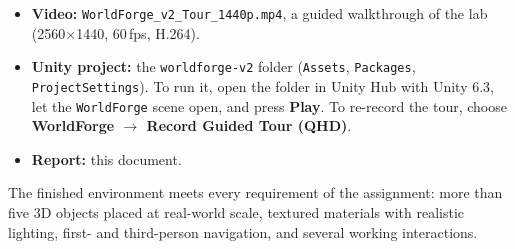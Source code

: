 \documentclass[11pt,a4paper]{article}
\begin{document}
\begin{itemize}
  \item \textbf{Video:} \texttt{WorldForge\_v2\_Tour\_1440p.mp4}, a guided walkthrough of the lab
        (2560$\times$1440, 60\,fps, H.264).
  \item \textbf{Unity project:} the \texttt{worldforge-v2} folder (\texttt{Assets}, \texttt{Packages},
        \texttt{ProjectSettings}). To run it, open the folder in Unity Hub with Unity 6.3, let the
        \texttt{WorldForge} scene open, and press \textbf{Play}. To re-record the tour, choose
        \textbf{WorldForge $\rightarrow$ Record Guided Tour (QHD)}.
  \item \textbf{Report:} this document.
\end{itemize}

The finished environment meets every requirement of the assignment: more than five 3D objects placed at
real-world scale, textured materials with realistic lighting, first- and third-person navigation, and several
working interactions.
\end{document}
